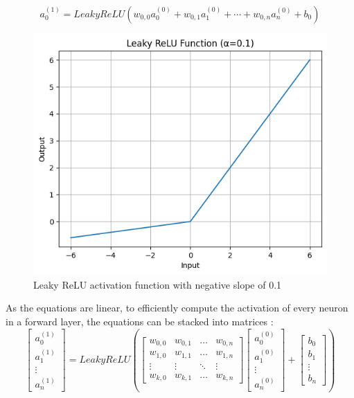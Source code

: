 \documentclass[twocolumn]{article}
\begin{document}
\begin{equation}
\label{eqn:activation}
a^{(1)}_0 = LeakyReLU(w_{0,0}a^{(0)}_0 + w_{0,1}a^{(0)}_1 + \cdots + w_{0,n}a^{(0)}_n + b_0)
\end{equation}

\begin{figure}[htbp]
\centering
\includegraphics[width=.9\linewidth]{images/LeakyReLU.png}
\caption{\label{fig:LeakyReLU}Leaky ReLU activation function with negative slope of 0.1}
\end{figure}


As the equations are linear, to efficiently compute the activation of every neuron in a forward layer, the equations can be stacked into matrices\autocite{3Blue1BrownWhatNeural} :
\begin{equation}
\begin{bmatrix} a^{(1)}_0 \\ a^{(1)}_1 \\ \vdots \\ a_n^{(1)} \end{bmatrix} = LeakyReLU \left( \begin{bmatrix}w_{0,0} & w_{0,1} & \dots & w_{0,n} \\ w_{1,0} & w_{1,1} & \dots & w_{1,n} \\ \vdots & \vdots & \ddots & \vdots \\ w_{k,0} & w_{k,1} & \dots & w_{k,n} \end{bmatrix} \begin{bmatrix} a_0^{(0)} \\ a_1^{(0)} \\ \vdots \\ a_n^{(0)} \end{bmatrix} + \begin{bmatrix} b_0 \\ b_1 \\ \vdots \\ b_n \end{bmatrix} \right)
\end{equation}
\end{document}
